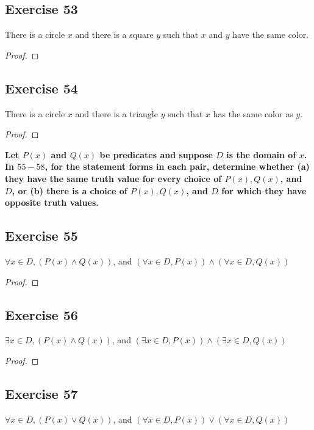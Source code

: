 \documentclass[14pt]{extarticle}
\newcommand{\fa}{\forall}
\newcommand{\te}{\exists}
\begin{document}
\subsection{Exercise 53}
There is a circle $x$ and there is a square $y$ such that $x$ and $y$ have the same color.

\begin{proof}

\end{proof}

\subsection{Exercise 54}
There is a circle $x$ and there is a triangle $y$ such that $x$ has the same color as $y$.

\begin{proof}

\end{proof}

{\bf \color{cyan} Let $P(x)$ and $Q(x)$ be predicates and suppose $D$ is the domain of $x$. In $55-58$, for the statement forms in each pair, determine whether (a) they have the same truth value for every choice of $P(x), Q(x)$, and $D$, or (b) there is a choice of $P(x), Q(x)$, and $D$ for which they have opposite truth values.}

\subsection{Exercise 55}
$\fa x \in D, (P(x) \wedge Q(x))$, and $(\fa x \in D, P(x)) \wedge (\fa x \in D, Q(x))$

\begin{proof}

\end{proof}

\subsection{Exercise 56}
$\te x \in D, (P(x) \wedge Q(x))$, and $(\te x \in D, P(x)) \wedge (\te x \in D, Q(x))$

\begin{proof}

\end{proof}

\subsection{Exercise 57}
$\fa x \in D, (P(x) \vee Q(x))$, and $(\fa x \in D, P(x)) \vee (\fa x \in D, Q(x))$
\end{document}
